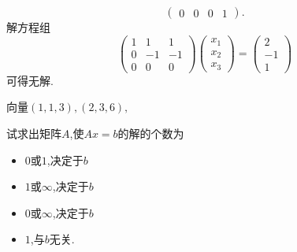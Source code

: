﻿\documentclass{book} \usepackage{exsheets} \usepackage{xeCJK}
\begin{document}
\begin{solution}
\begin{itemize}
$$\begin{pmatrix}
  0&0&0&1
\end{pmatrix}.
$$
解方程组
$$
\begin{pmatrix}
  1&1&1\\
  0&-1&-1\\
  0&0&0
\end{pmatrix}
\begin{pmatrix}
  x_1\\
  x_2\\
  x_3
\end{pmatrix}=
\begin{pmatrix}
  2\\
  -1\\
  1
\end{pmatrix}
$$
可得无解.
\end{itemize}
\end{solution}
\begin{question}
  向量$(1,1,3),(2,3,6),$
\end{question}
\begin{solution}
  
\end{solution}
\begin{question}
  试求出矩阵$A$,使$Ax=b$的解的个数为
  \begin{itemize}
  \item $0$或$1$,决定于$b$
  \item $1$或$\infty$,决定于$b$
  \item $0$或$\infty$,决定于$b$
  \item $1$,与$b$无关.
  \end{itemize}
\end{question}
\end{document}
